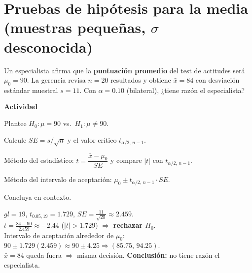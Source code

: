
\section{Pruebas de hipótesis para la media (muestras pequeñas, $\sigma$ desconocida)}

\begin{ejercicio}[Puntuación de test de actitudes (n=20)]
Un especialista afirma que la \textbf{puntuación promedio} del test de actitudes será $\mu_0=90$.
La gerencia revisa $n=20$ resultados y obtiene $\bar{x}=84$ con desviación estándar muestral $s=11$.
Con $\alpha=0.10$ (bilateral), ¿tiene razón el especialista?


\textbf{Actividad}
\begin{pasos}
  \item Plantee $H_0:\mu=90$ vs.\ $H_1:\mu\neq90$.
  \item Calcule $SE = s/\sqrt{n}$ y el valor crítico $t_{\alpha/2,\,n-1}$.
  \item Método del estadístico: $t=\dfrac{\bar{x}-\mu_0}{SE}$ y compare $|t|$ con $t_{\alpha/2,\,n-1}$.
  \item Método del intervalo de aceptación: $\mu_0 \pm t_{\alpha/2,\,n-1}\cdot SE$.
  \item Concluya en contexto.
\end{pasos}

\begin{clave}
$gl=19$, \; $t_{0.05,19}=1.729$, \;
$SE=\tfrac{11}{\sqrt{20}}\approx 2.459$.\\
$t=\frac{84-90}{2.459}\approx -2.44$ \; ($|t|>1.729$) $\Rightarrow$ \textbf{rechazar $H_0$}.\\
Intervalo de aceptación alrededor de $\mu_0$: $90\pm 1.729(2.459)\approx 90\pm 4.25\Rightarrow (85.75,\,94.25)$.\\
$\bar{x}=84$ queda fuera $\Rightarrow$ misma decisión. \textbf{Conclusión:} no tiene razón el especialista.
\end{clave}
\end{ejercicio}


